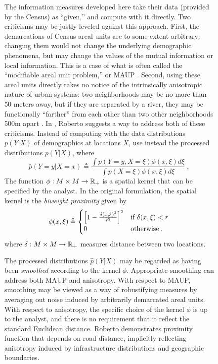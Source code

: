 \documentclass[english]{scrartcl}
\begin{document}
\begin{figure}
		The information measures developed here take their data (provided by the Census) as ``given,'' and compute with it directly. Two criticisms may be justly leveled against this approach. First, the demarcations of Census areal units are to some extent arbitrary: changing them would not change the underlying demographic phenomena, but may change the values of the mutual information or local information. This is a case of what is often called the ``modifiable areal unit problem,'' or MAUP \cite{Openshaw1981}. Second, using these areal units directly takes no notice of the intrinsically anisotropic nature of urban systems: two neighborhoods may be no more than 50 meters away, but if they are separated by a river, they may be functionally ``farther'' from each other than two other neighborhoods 500m apart \cite{Roberto2015}. In \cite{Roberto2015}, Roberto suggests a way to address both of these criticisms. Instead of computing with the data distributions $p(Y|X)$ of demographics at locations $X$, use instead the processed distributions $\bar{p}(Y|X)$, where 
		\begin{equation}
				\bar{p}(Y = y|X = x) \triangleq \frac{\int p(Y = y,X = \xi)\phi(x, \xi) d\xi}{\int p(X = \xi)\phi(x, \xi) d\xi}\;, \label{eq:divergence_smoother}
		\end{equation} 
		The function $\phi:M\times M \rightarrow \mathbb{R}_+$ is a spatial kernel that can be specified by the analyst. In the original formulation, the spatial kernel is the \emph{biweight proximity} given by 
		\begin{equation*}
			\phi(x, \xi) \triangleq 
			\begin{cases} 
				\left[1 - \frac{\delta(x, \xi)^2}{r^2} \right]^2 & \text{if } \delta(x, \xi) < r \\
				0 & \text{otherwise\;},
			\end{cases}
		\end{equation*}
		where $\delta:M\times M \rightarrow \mathbb{R}_+$ measures distance between two locations. 

		The processed distributions $\hat{p}(Y|X)$ may be regarded as having been \emph{smoothed} according to the kernel $\phi$. Appropriate smoothing can address both MAUP and anisotropy. With respect to MAUP, smoothing may be viewed as a way of robustifying measures by averaging out noise induced by arbitrarily demarcated areal units. With respect to anisotropy, the specific choice of the kernel $\phi$ is up to the analyst, and there is no requirement that it reflect the standard Euclidean distance. Roberto demonstrates proximity function that depends on road distance, implicitly reflecting anisotropy induced by infrastructure distributions and geographic boundaries. 


\end{figure}
\end{document}
